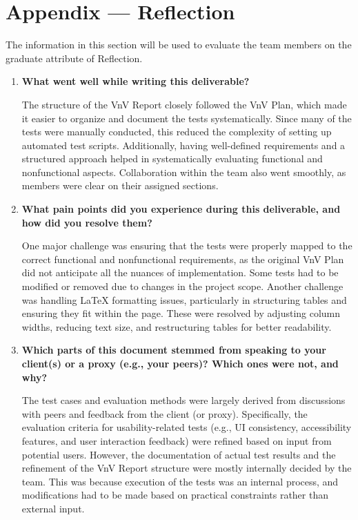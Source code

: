 \documentclass[12pt, titlepage]{article}
\begin{document}



\newpage{}
\section*{Appendix --- Reflection}

The information in this section will be used to evaluate the team members on the graduate attribute of Reflection.

\begin{enumerate}
  \item \textbf{What went well while writing this deliverable?}  

  The structure of the VnV Report closely followed the VnV Plan, which made it easier to organize and document the tests systematically. Since many of the tests were manually conducted, this reduced the complexity of setting up automated test scripts. Additionally, having well-defined requirements and a structured approach helped in systematically evaluating functional and nonfunctional aspects. Collaboration within the team also went smoothly, as members were clear on their assigned sections.

  \item \textbf{What pain points did you experience during this deliverable, and how did you resolve them?}  

  One major challenge was ensuring that the tests were properly mapped to the correct functional and nonfunctional requirements, as the original VnV Plan did not anticipate all the nuances of implementation. Some tests had to be modified or removed due to changes in the project scope. Another challenge was handling LaTeX formatting issues, particularly in structuring tables and ensuring they fit within the page. These were resolved by adjusting column widths, reducing text size, and restructuring tables for better readability.

  \item \textbf{Which parts of this document stemmed from speaking to your client(s) or a proxy (e.g., your peers)? Which ones were not, and why?}  

  The test cases and evaluation methods were largely derived from discussions with peers and feedback from the client (or proxy). Specifically, the evaluation criteria for usability-related tests (e.g., UI consistency, accessibility features, and user interaction feedback) were refined based on input from potential users. However, the documentation of actual test results and the refinement of the VnV Report structure were mostly internally decided by the team. This was because execution of the tests was an internal process, and modifications had to be made based on practical constraints rather than external input.


\end{enumerate}
\end{document}
